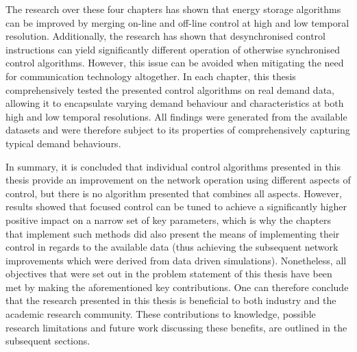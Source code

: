 The research over these four chapters has shown that energy storage algorithms can be improved by merging on-line and off-line control at high and low temporal resolution.
Additionally, the research has shown that desynchronised control instructions can yield significantly different operation of otherwise synchronised control algorithms.
However, this issue can be avoided when mitigating the need for communication technology altogether.
In each chapter, this thesis comprehensively tested the presented control algorithms on real demand data, allowing it to encapsulate varying demand behaviour and characteristics at both high and low temporal resolutions.
All findings were generated from the available datasets and were therefore subject to its properties of comprehensively capturing typical demand behaviours.

In summary, it is concluded that individual control algorithms presented in this thesis provide an improvement on the network operation using different aspects of control, but there is no algorithm presented that combines all aspects.
However, results showed that focused control can be tuned to achieve a significantly higher positive impact on a narrow set of key parameters, which is why the chapters that implement such methods did also present the means of implementing their control in regards to the available data (thus achieving the subsequent network improvements which were derived from data driven simulations).
Nonetheless, all objectives that were set out in the problem statement of this thesis have been met by making the aforementioned key contributions.
One can therefore conclude that the research presented in this thesis is beneficial to both industry and the academic research community.
These contributions to knowledge, possible research limitations and future work discussing these benefits, are outlined in the subsequent sections.
